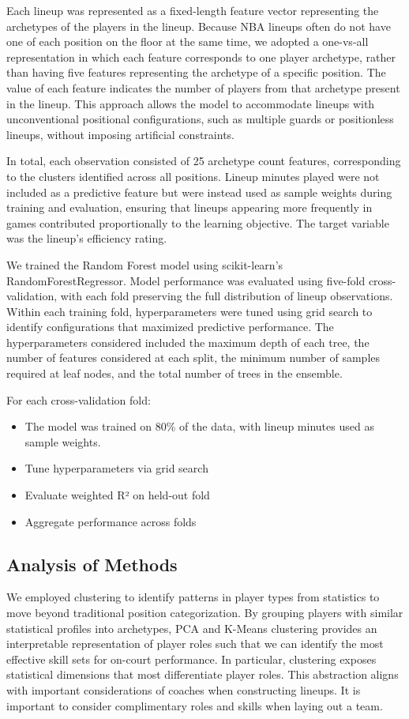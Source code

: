 \documentclass{article}
\begin{document}
Each lineup was represented as a fixed-length feature vector representing the archetypes of the 
players in the lineup. Because NBA lineups often do not have one of each position on the floor 
at the same time, we adopted a one-vs-all representation in which each feature corresponds to 
one player archetype, rather than having five features representing the archetype of a specific 
position. The value of each feature indicates the number of players from that archetype present 
in the lineup. This approach allows the model to accommodate lineups with unconventional 
positional configurations, such as multiple guards or positionless lineups, without imposing 
artificial constraints.

In total, each observation consisted of 25 archetype count features, corresponding to the 
clusters identified across all positions. Lineup minutes played were not included as a predictive 
feature but were instead used as sample weights during training and evaluation, ensuring that 
lineups appearing more frequently in games contributed proportionally to the learning objective. 
The target variable was the lineup’s efficiency rating.

We trained the Random Forest model using scikit-learn’s RandomForestRegressor. Model performance 
was evaluated using five-fold cross-validation, with each fold preserving the full distribution 
of lineup observations. Within each training fold, hyperparameters were tuned using grid search 
to identify configurations that maximized predictive performance. The hyperparameters considered 
included the maximum depth of each tree, the number of features considered at each split, 
the minimum number of samples required at leaf nodes, and the total number of trees in the 
ensemble.

For each cross-validation fold:
\begin{itemize}
    \item The model was trained on 80\% of the data, with lineup minutes used as sample weights.
    \item Tune hyperparameters via grid search
    \item Evaluate weighted R² on held-out fold
    \item Aggregate performance across folds
\end{itemize}



\subsection{Analysis of Methods}
We employed clustering to identify patterns in player types from statistics to move beyond traditional 
position categorization. By grouping players with similar statistical profiles into archetypes, PCA 
and K-Means clustering provides an interpretable representation of player roles such that we can identify
the most effective skill sets for on-court performance. In particular, clustering exposes statistical 
dimensions that most differentiate player roles. This abstraction aligns with important considerations 
of coaches when constructing lineups. It is important to consider complimentary roles and skills when 
laying out a team.
\end{document}
